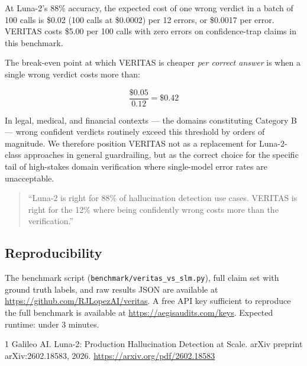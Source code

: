 At Luna-2's 88\% accuracy, the expected cost of one wrong verdict
in a batch of 100 calls is \$0.02 (100 calls at \$0.0002) per
12 errors, or \$0.0017 per error. VERITAS costs \$5.00 per 100 calls
with zero errors on confidence-trap claims in this benchmark.

The break-even point at which VERITAS is cheaper \textit{per correct
answer} is when a single wrong verdict costs more than:

\[
\frac{\$0.05}{0.12} = \$0.42
\]

In legal, medical, and financial contexts --- the domains constituting
Category B --- wrong confident verdicts routinely exceed this threshold
by orders of magnitude. We therefore position VERITAS not as a
replacement for Luna-2-class approaches in general guardrailing,
but as the correct choice for the specific tail of high-stakes
domain verification where single-model error rates are unacceptable.

\begin{quote}
``Luna-2 is right for 88\% of hallucination detection use cases.
VERITAS is right for the 12\% where being confidently wrong costs
more than the verification.''
\end{quote}

\subsection{Reproducibility}

The benchmark script (\texttt{benchmark/veritas\_vs\_slm.py}),
full claim set with ground truth labels, and raw results JSON
are available at \url{https://github.com/RJLopezAI/veritas}.
A free API key sufficient to reproduce the full benchmark
is available at \url{https://aegisaudits.com/keys}.
Expected runtime: under 3 minutes.


\begin{thebibliography}{1}
Galileo AI.
\newblock Luna-2: Production Hallucination Detection at Scale.
\newblock arXiv preprint arXiv:2602.18583, 2026.
\newblock \url{https://arxiv.org/pdf/2602.18583}
\end{thebibliography}
